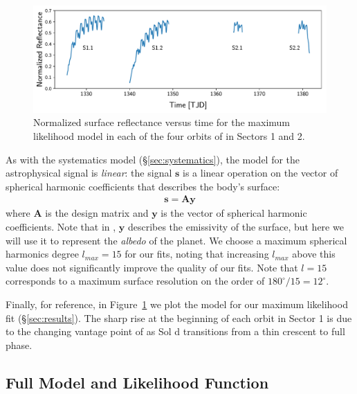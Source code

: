\documentclass[modern]{aastex62}
\begin{document}
\begin{figure}[ht!]
    \begin{centering}
    \includegraphics[width=\linewidth]{figures/starry_model.pdf}
    \caption{\label{fig:starry_model}
             Normalized surface reflectance versus time for the maximum
             likelihood \starry model in each of the four orbits of \tess
             in Sectors 1 and 2.
             }
    \end{centering}
\end{figure}

As with the systematics model (\S\ref{sec:systematics}), the model
for the astrophysical signal is \emph{linear}: the signal $\mathbf{s}$ 
is a linear operation on the vector of spherical harmonic coefficients 
that describes the body's surface:
%
\begin{align}
    \mathbf{s} = \mathbf{A} \mathbf{y}
\end{align}
%
where $\mathbf{A}$ is the design matrix and $\mathbf{y}$ is the vector of spherical harmonic coefficients. 
Note that in \cite{Luger2019}, $\mathbf{y}$ describes the emissivity of the surface,
but here we will use it to represent the \emph{albedo} of the planet.
We choose a maximum spherical harmonics degree $l_{max} = 15$ for our fits,
noting that increasing $l_{max}$ above this value does not significantly
improve the quality of our fits. Note that $l = 15$ corresponds to
a maximum surface resolution on the order of $180^\circ/15 = 12^\circ$.

Finally, for reference, in Figure~\ref{fig:starry_model} we plot the
\starry model for our maximum likelihood fit (\S\ref{sec:results}). The
sharp rise at the beginning of each orbit in Sector 1 is due to the changing
vantage point of \tess as Sol d transitions from a thin crescent to full phase.

\subsection{Full Model and Likelihood Function}
\label{sec:model}
\end{document}
